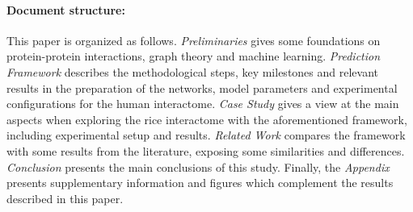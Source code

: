 \paragraph*{Document structure:} This paper is organized as follows. \emph{Preliminaries} 
gives some foundations on protein-protein interactions, graph theory 
and machine learning. \emph{Prediction Framework} describes
the methodological steps, key milestones and relevant results in the preparation 
of the networks, model parameters and experimental configurations for the human
interactome.
\emph{Case Study} gives a view at the main aspects when exploring the rice
interactome with the aforementioned framework, including experimental setup and results.
\emph{Related Work} compares the framework with some results from the literature, 
exposing some similarities and differences.
\emph{Conclusion} presents the main conclusions of this study. Finally, the \emph{Appendix}
presents supplementary information and figures which complement the
results described in this paper.